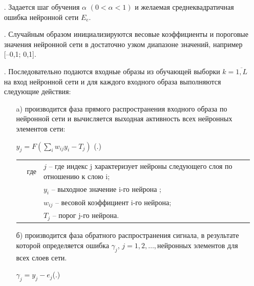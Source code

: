 {	\begin{itemize}[leftmargin=2.15cm, labelwidth=0.65cm, labelsep=0.0cm] 
		
		\item[\theitemcntr. ] Задается шаг обучения $\alpha$  $(0 < \alpha < 1)$ и желаемая среднеквадратичная ошибка нейронной сети $E_e$.
		
		\addtocounter{itemcntr}{1}
		
		\item[\theitemcntr. ] Случайным образом инициализируются весовые коэффициенты и пороговые значения нейронной сети в достаточно узком диапазоне значений, например [–0,1; 0,1].
		
		\addtocounter{itemcntr}{1}
		
		\item[\theitemcntr. ] Последовательно подаются входные образы из обучающей выборки $k = \overline{1,L}$ на вход нейронной сети и для каждого входного образа выполняются следующие действия:
		
		\begin{itemize}[leftmargin=1.5cm, labelwidth=0.65cm, labelsep=0.0cm] 
			
			\item[a)] производится фаза прямого распространения входного образа по нейронной сети и вычисляется выходная активность всех нейронных элементов сети:
			
			\formulaspace \par \redline 
			$y_{j} = F(\sum \limits _{i}^{} w_{ij}y_{i} - T_{j}) $
			\hfill (\thechaptercntr .\theformulacntr) \redline
			\formulaspace \addtocounter{formulacntr}{1}
			
			\begin{tabular}{p{}p{}p{}}
				& где  & $j$ {--} где индекс j характеризует нейроны следующего слоя по отношению к
				слою i; \\
				&      & $y_{i}$ {--} выходное значение i-го нейрона ; \\
				&      & $w_{ij}$ {--} весовой коэффициент i-го нейрона; \\
				&      & $T_{j}$ {--} порог j-го нейрона. \\
			\end{tabular}
			\item[б)]	производится фаза обратного распространения сигнала, в результате которой определяется ошибка $\gamma_{j}$, $j=1,2,\dots, $нейронных элементов
			для всех слоев сети. 
			
			\formulaspace \par \redline 
			$\gamma_{j} = y_{j} - e_{j} $\hfill (\thechaptercntr .\theformulacntr) \redline
			\formulaspace \addtocounter{formulacntr}{1}
			

\end{itemize}
\end{itemize}}
